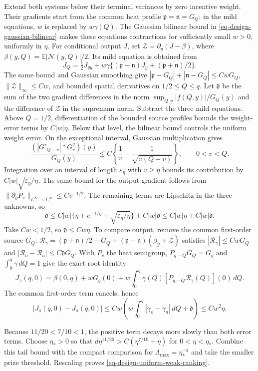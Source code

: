 \documentclass[mnsc]{informs3}
\begin{document}
\begin{APPENDICES}
{Extend both systems below their terminal variances by zero incentive
weight. Their gradients start from the common heat profile ${\mathfrak p}={\mathfrak n}=G_Q$;
in the mild equations, $w$ is replaced by $w\gamma(Q)$.
The Gaussian bilinear bound in
\eqref{eq-design-gaussian-bilinear} makes these equations contractions
for sufficiently small $w>0$, uniformly in $\eta$.
For conditional output $J$, set ${\mathscr Z}=\partial_y(J-\beta)$, where
$\beta(y,Q)=\mathbb E|\mathcal N(y,Q)|/2$.
Its mild equation is obtained from
\[
J_Q=\tfrac12J_{yy}+w\gamma\{({\mathfrak p}-{\mathfrak n})J_y+({\mathfrak p}+{\mathfrak n})/2\}.
\]
The same bound and Gaussian smoothing give
$|{\mathfrak p}-G_Q|+|{\mathfrak n}-G_Q|\leq CwG_Q$, $\|{\mathscr Z}\|_\infty\leq Cw$,
and bounded spatial derivatives on $1/2\leq Q\leq q$.
Let $\mathfrak d$ be the sum of the two gradient differences in the norm
$\sup_{Q,y}|f(Q,y)|/G_Q(y)$ and the difference of ${\mathscr Z}$ in the supremum norm.
Subtract the three mild equations. Above $Q=1/2$, differentiation of
the bounded source profiles bounds the weight-error terms by $C|w|\eta$.
Below that level, the bilinear bound controls the uniform weight error.
On the exceptional interval, Gaussian multiplication gives
\[
\frac{(|G'_{Q-v}|*G_v^2)(y)}{G_Q(y)}
\leq C\left\{\frac1v+\frac1{\sqrt{v(Q-v)}}\right\},\qquad 0<v<Q.
\]
Integration over an interval of length $\varepsilon_\eta$ with $v\geq\eta$
bounds its contribution by $C|w|\sqrt{\varepsilon_\eta/\eta}$.
The same bound for the output gradient follows from
$\|\partial_yP_v\|_{L^\infty\to L^\infty}\leq Cv^{-1/2}$.
The remaining terms are Lipschitz in the three unknowns, so
\[
\mathfrak d\leq C|w|\{\eta+e^{-1/\eta}+\sqrt{\varepsilon_\eta/\eta}\}
+C|w|\mathfrak d\leq C|w|\eta+C|w|\mathfrak d.
\]
Take $Cw<1/2$, so $\mathfrak d\leq Cw\eta$.
To compare output, remove the common first-order source $G_Q$:
$\mathcal R_\gamma=({\mathfrak p}+{\mathfrak n})/2-G_Q+({\mathfrak p}-{\mathfrak n})(\beta_y+{\mathscr Z})$ satisfies
$|\mathcal R_\gamma|\leq CwG_Q$ and
$|\mathcal R_o-\mathcal R_a|\leq C\mathfrak dG_Q$.
With $P_v$ the heat semigroup, $P_{q-Q}G_Q=G_q$ and
$\int_0^q\gamma\,dQ=1$ give the exact root identity
\[
J_\gamma(q,0)=\beta(0,q)+wG_q(0)
+w\int_0^q\gamma(Q)[P_{q-Q}\mathcal R_\gamma(Q)](0)\,dQ.
\]
The common first-order term cancels, hence
\[
|J_o(q,0)-J_a(q,0)|
\leq Cw\left(w\int_0^q|\gamma_o-\gamma_a|\,dQ+\mathfrak d\right)
\leq Cw^2\eta.
\]

Because $11/20<7/10<1$, the positive term decays more slowly than both
error terms. Choose $\eta_*>0$ so that
$d\eta^{11/20}>C(\eta^{7/10}+\eta)$ for $0<\eta<\eta_*$.
Combine this tail bound with the compact comparison for
${\Lambda_{\max}}=\eta_*^{-2}$ and take the smaller prize threshold.
Rescaling proves \eqref{eq-design-uniform-weak-ranking}.
\Halmos
\endproof

}
\end{APPENDICES}
\end{document}
